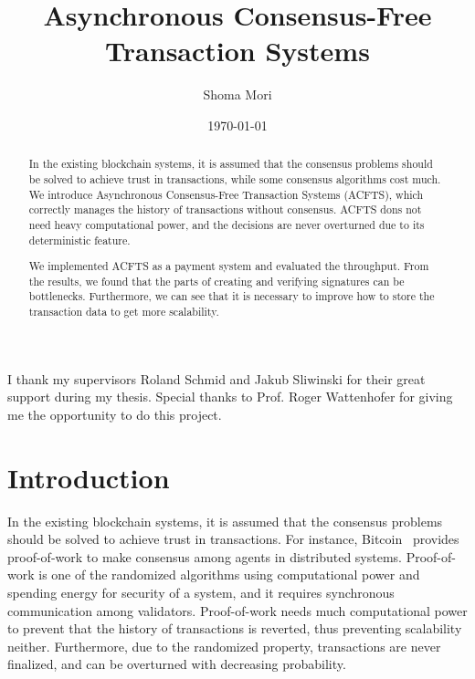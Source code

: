 \documentclass[a4paper, oneside]{discothesis}
\title{Asynchronous Consensus-Free Transaction Systems}
\author{Shoma Mori}
\institute{Distributed Computing Group \\[2pt]
Computer Engineering and Networks Laboratory \\[2pt]
ETH Zürich}
\date{\today}
\begin{document}
\frontmatter %
\maketitle

\cleardoublepage

\begin{acknowledgements}
    I thank my supervisors Roland Schmid and Jakub Sliwinski for their great support
    during my thesis.
    Special thanks to Prof. Roger Wattenhofer for giving me the opportunity to do this project.
\end{acknowledgements}


\begin{abstract}
In the existing blockchain systems, it is assumed that the consensus problems
should be solved to achieve trust in transactions, while some consensus algorithms cost much.
We introduce Asynchronous Consensus-Free Transaction Systems (ACFTS),
which correctly manages the history of transactions without consensus.
ACFTS dons not need heavy computational power, and the decisions are never overturned
due to its deterministic feature.

We implemented ACFTS as a payment system and evaluated the throughput.
From the results, we found that the parts of creating and verifying signatures
can be bottlenecks.
Furthermore, we can see that it is necessary to improve how to store the transaction data
to get more scalability.
\end{abstract}

\tableofcontents

\mainmatter %

\chapter{Introduction}

In the existing blockchain systems, it is assumed that the consensus problems
should be solved to achieve trust in transactions.
For instance, Bitcoin~\cite{bitcoin} provides proof-of-work to make consensus
among agents in distributed systems.
Proof-of-work is one of the randomized algorithms using computational power
and spending energy for security of a system, and it requires synchronous communication
among validators.
Proof-of-work needs much computational power to prevent that the history of transactions
is reverted, thus preventing scalability neither.
Furthermore, due to the randomized property, transactions are never finalized,
and can be overturned with decreasing probability.
\end{document}
